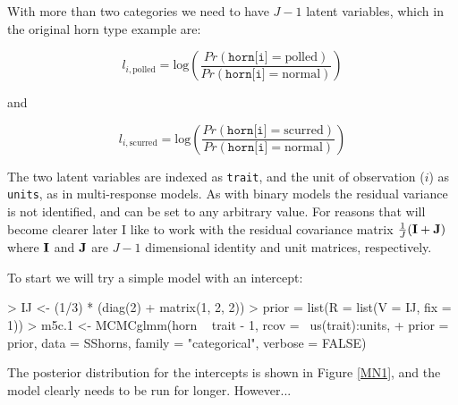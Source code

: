 \documentclass{article}
\begin{document}
With more than two categories we need to have $J-1$ latent variables, which in the original horn type example are:

\begin{equation}
l_{i,\textrm{polled}} = \textrm{log}\left(\frac{Pr(\texttt{horn[i]}=\textrm{polled})}{Pr(\texttt{horn[i]}=\textrm{normal})}\right)
\end{equation}

and 

\begin{equation}
l_{i,\textrm{scurred}} = \textrm{log}\left(\frac{Pr(\texttt{horn[i]}=\textrm{scurred})}{Pr(\texttt{horn[i]}=\textrm{normal})}\right)
\end{equation}


The two latent variables are indexed as \texttt{trait}, and the unit of observation ($i$) as \texttt{units}, as in multi-response models. As with binary models the residual variance is not identified, and can be set to any arbitrary value. For reasons that will become clearer later I like to work with the residual covariance matrix $\frac{1}{J}({\bf I}+{\bf J})$ where  ${\bf I}$ and ${\bf J}$ are $J-1$ dimensional identity and unit matrices, respectively.

To start we will try a simple model with an intercept:\\

\begin{Schunk}
\begin{Sinput}
> IJ <- (1/3) * (diag(2) + matrix(1, 2, 2))
> prior = list(R = list(V = IJ, fix = 1))
> m5c.1 <- MCMCglmm(horn ~ trait - 1, rcov = ~us(trait):units, 
+     prior = prior, data = SShorns, family = "categorical", verbose = FALSE)
\end{Sinput}
\end{Schunk}

The posterior distribution for the intercepts is shown in Figure \ref{MN1}, and the model clearly needs to be run for longer. However...\\
\end{document}
